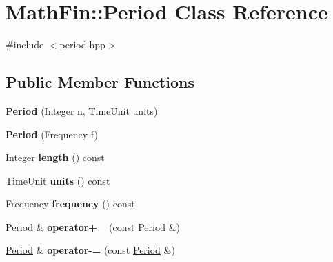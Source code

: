 \hypertarget{class_math_fin_1_1_period}{}\section{Math\+Fin\+:\+:Period Class Reference}
\label{class_math_fin_1_1_period}


{\ttfamily \#include $<$period.\+hpp$>$}

\subsection*{Public Member Functions}
\begin{DoxyCompactItemize}
\item 
\hypertarget{class_math_fin_1_1_period_af1920404b82d21b27134294329f4cce8}{}{\bfseries Period} (Integer n, Time\+Unit units)\label{class_math_fin_1_1_period_af1920404b82d21b27134294329f4cce8}

\item 
\hypertarget{class_math_fin_1_1_period_a08693e58f774a713128d192c1a443cbe}{}{\bfseries Period} (Frequency f)\label{class_math_fin_1_1_period_a08693e58f774a713128d192c1a443cbe}

\item 
\hypertarget{class_math_fin_1_1_period_aa637294313b506ca07303be1022903ae}{}Integer {\bfseries length} () const \label{class_math_fin_1_1_period_aa637294313b506ca07303be1022903ae}

\item 
\hypertarget{class_math_fin_1_1_period_ae6b162ff50611ba38aa80e02e71a8ce5}{}Time\+Unit {\bfseries units} () const \label{class_math_fin_1_1_period_ae6b162ff50611ba38aa80e02e71a8ce5}

\item 
\hypertarget{class_math_fin_1_1_period_a252c094085c1680ff8b255e6b093f15a}{}Frequency {\bfseries frequency} () const \label{class_math_fin_1_1_period_a252c094085c1680ff8b255e6b093f15a}

\item 
\hypertarget{class_math_fin_1_1_period_a006f2a66b9bed500cc4a87d0405b8e0e}{}\hyperlink{class_math_fin_1_1_period}{Period} \& {\bfseries operator+=} (const \hyperlink{class_math_fin_1_1_period}{Period} \&)\label{class_math_fin_1_1_period_a006f2a66b9bed500cc4a87d0405b8e0e}

\item 
\hypertarget{class_math_fin_1_1_period_a22800432343ca2f67a6e22a09886d26c}{}\hyperlink{class_math_fin_1_1_period}{Period} \& {\bfseries operator-\/=} (const \hyperlink{class_math_fin_1_1_period}{Period} \&)\label{class_math_fin_1_1_period_a22800432343ca2f67a6e22a09886d26c}


\end{DoxyCompactItemize}
